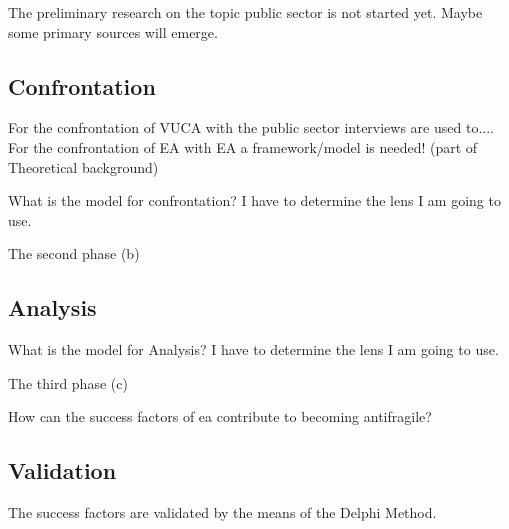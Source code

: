 \begin{remark}
	The preliminary research on the topic public sector is not started yet. Maybe some primary sources will emerge.
\end{remark}

\subsection{Confrontation}
\label{sub:confrontationphase}

For the confrontation of VUCA with the public sector interviews are used to....\\
For the confrontation of EA with EA a framework/model is needed! (part of Theoretical background)

\begin{remark}
	What is the model for confrontation?
	I have to determine the lens I am going to use.
\end{remark}

The second phase (b) 

\subsection{Analysis}
\label{sub:analysisphase}

\begin{remark}
	What is the model for Analysis?
	I have to determine the lens I am going to use.
\end{remark}

The third phase (c)

How can the success factors of \acrlong{ea} contribute to becoming antifragile?

\subsection{Validation}
\label{sub:validatinphase}
The success factors are validated by the means of the Delphi Method.

